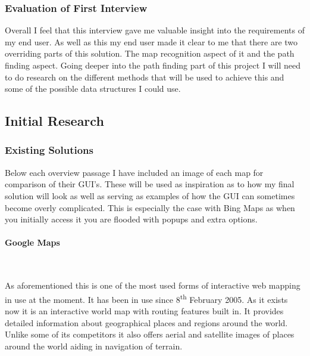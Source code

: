 \begin{FlushLeft}
            \subsubsection{Evaluation of First Interview}
            Overall I feel that this interview gave me valuable insight into the requirements of my end user. As well as this my end user made it clear to me that there are two overriding 
            parts of this solution. The map recognition aspect of it and the path finding aspect. Going deeper into the path finding part of this project I will need to do research on the 
            different methods that will be used to achieve this and some of the possible data structures I could use. \\
        \bk

        \subsection{Initial Research} 
            \subsubsection{Existing Solutions}
            Below each overview passage I have included an image of each map for comparison of their GUI's. These will be used as inspiration as to how my final solution will look as well 
            as serving as examples of how the GUI can sometimes become overly complicated. This is especially the case with Bing Maps as when you initially access it you are flooded with 
            popups and extra options. \\
            \paragraph{Google Maps} \mbox{} \\
            \bk
            
            As aforementioned this is one of the most used forms of interactive web mapping in use at the moment. It has been in use since 8\textsuperscript{th} February 2005. As it exists
            now it is an interactive world map with routing features built in. It provides detailed information about geographical places and regions around the world. Unlike some of its
            competitors it also offers aerial and satellite images of places around the world aiding in navigation of terrain. \\
            
            \bk
            

\end{FlushLeft}
